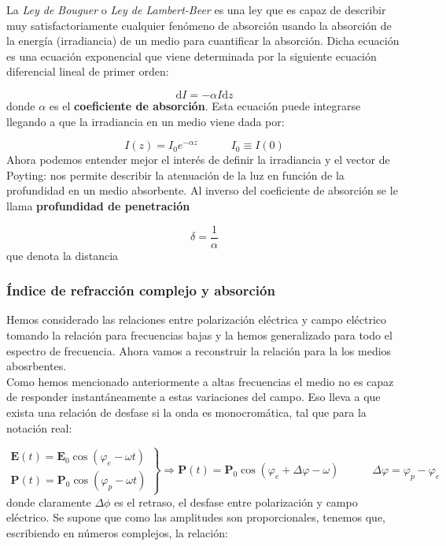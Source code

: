 \documentclass[12pt,a4paper]{article}
\newcommand{\D}{\mathrm{d}}
\newcommand{\tquad}{\quad \quad \quad}
\newcommand{\En}{\mathbf{E}}
\newcommand{\Pn}{\mathbf{P}}
\numberwithin{equation}{section}
\numberwithin{figure}{section}
\begin{document}
La \textit{Ley de Bouguer} o \textit{Ley de Lambert-Beer} es una ley que es capaz de describir muy satisfactoriamente cualquier fenómeno de absorción usando la absorción de la energía (irradiancia) de un medio para cuantificar la absorción. Dicha ecuación es una ecuación exponencial que viene determinada por la siguiente ecuación diferencial lineal de primer orden:

\begin{equation}
\D I = - \alpha I \D z
\end{equation}
donde $\alpha$ es el \textbf{coeficiente de absorción}. Esta ecuación puede integrarse llegando a que la irradiancia en un medio viene dada por:

\begin{equation}
I(z) = I_0 e^{- \alpha z} \tquad I_0 \equiv I (0)
\end{equation}
Ahora podemos entender mejor el interés de definir la irradiancia y el vector de Poyting: nos permite describir la atenuación  de la luz en función de la profundidad en un medio absorbente. Al inverso del coeficiente de absorción se le llama \textbf{profundidad de penetración} 

\begin{equation}
\delta = \dfrac{1}{\alpha}
\end{equation}
que denota la distancia 

\subsubsection{Índice de refracción complejo y absorción}

Hemos considerado las relaciones entre polarización eléctrica y campo eléctrico tomando la relación para frecuencias bajas y la hemos generalizado para todo el espectro de frecuencia. Ahora vamos a reconstruir la relación para la los medios abosrbentes. \\

Como hemos mencionado anteriormente a altas frecuencias el medio no es capaz de responder instantáneamente a estas variaciones del campo. Eso lleva a que exista una relación de desfase si la onda es monocromática, tal que para la notación real:

\begin{equation} 
\left.
\begin{array}{l}
\En (t) = \En_0 \cos (\varphi_e - \omega t) \\
\Pn (t) = \Pn_0 \cos (\varphi_p - \omega t) 
\end{array} \right\rbrace \Longrightarrow \Pn (t) = \Pn_0 \cos (\varphi_e + \Delta \varphi - \omega ) \tquad \Delta \varphi = \varphi_p - \varphi_e
\end{equation}
donde claramente $\Delta \phi$ es el retraso, el desfase entre polarización y campo eléctrico. Se supone que como las amplitudes son proporcionales, tenemos que, escribiendo en números complejos, la relación:
\end{document}
